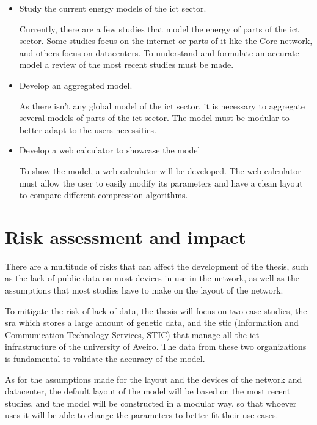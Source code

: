 \begin{itemize}
    \item Study the current energy models of the \ac{ict} sector.

    Currently, there are a few studies that model the energy of parts of the \ac{ict} sector. Some studies focus on the internet or parts of it like the Core network, and others focus on datacenters. To understand and formulate an accurate model a review of the most recent studies must be made. 

    \item Develop an aggregated model.

    As there isn't any global model of the \ac{ict} sector, it is necessary to aggregate several models of parts of the \ac{ict} sector. The model must be modular to better adapt to the users necessities.

    \item Develop a web calculator to showcase the model

    To show the model, a web calculator will be developed. The web calculator must allow the user to easily modify its parameters and have a clean layout to compare different compression algorithms.

\end{itemize}

\section{Risk assessment and impact}

There are a multitude of risks that can affect the development of the thesis, such as the lack of public data on most devices in use in the network, as well as the assumptions that most studies have to make on the layout of the network.

To mitigate the risk of lack of data, the thesis will focus on two case studies, the \ac{sra} which stores a large amount of genetic data, and the \acl{stic} (Information and Communication Technology Services, STIC) that manage all the \ac{ict} infrastructure of the university of Aveiro. The data from these two organizations is fundamental to validate the accuracy of the model. 

As for the assumptions made for the layout and the devices of the network and datacenter, the default layout of the model will be based on the most recent studies, and the model will be constructed in a modular way, so that whoever uses it will be able to change the parameters to better fit their use cases.

